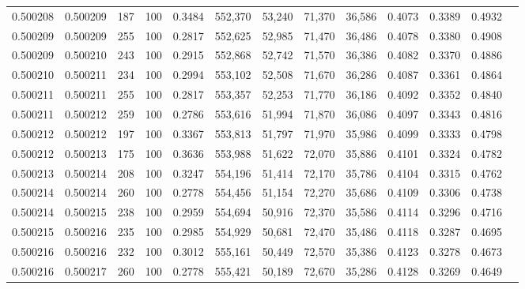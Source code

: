 \begin{tabular}{rrrrrrrrrrrrr}
0.500208 & 0.500209 &   187 & 100 &                                     0.3484 & 552,370 &  53,240 &  71,370 &  36,586 & 0.4073 & 0.3389 & 0.4932 \\
0.500209 & 0.500209 &   255 & 100 &                                     0.2817 & 552,625 &  52,985 &  71,470 &  36,486 & 0.4078 & 0.3380 & 0.4908 \\
0.500209 & 0.500210 &   243 & 100 &                                     0.2915 & 552,868 &  52,742 &  71,570 &  36,386 & 0.4082 & 0.3370 & 0.4886 \\
0.500210 & 0.500211 &   234 & 100 &                                     0.2994 & 553,102 &  52,508 &  71,670 &  36,286 & 0.4087 & 0.3361 & 0.4864 \\
0.500211 & 0.500211 &   255 & 100 &                                     0.2817 & 553,357 &  52,253 &  71,770 &  36,186 & 0.4092 & 0.3352 & 0.4840 \\
0.500211 & 0.500212 &   259 & 100 &                                     0.2786 & 553,616 &  51,994 &  71,870 &  36,086 & 0.4097 & 0.3343 & 0.4816 \\
0.500212 & 0.500212 &   197 & 100 &                                     0.3367 & 553,813 &  51,797 &  71,970 &  35,986 & 0.4099 & 0.3333 & 0.4798 \\
0.500212 & 0.500213 &   175 & 100 &                                     0.3636 & 553,988 &  51,622 &  72,070 &  35,886 & 0.4101 & 0.3324 & 0.4782 \\
0.500213 & 0.500214 &   208 & 100 &                                     0.3247 & 554,196 &  51,414 &  72,170 &  35,786 & 0.4104 & 0.3315 & 0.4762 \\
0.500214 & 0.500214 &   260 & 100 &                                     0.2778 & 554,456 &  51,154 &  72,270 &  35,686 & 0.4109 & 0.3306 & 0.4738 \\
0.500214 & 0.500215 &   238 & 100 &                                     0.2959 & 554,694 &  50,916 &  72,370 &  35,586 & 0.4114 & 0.3296 & 0.4716 \\
0.500215 & 0.500216 &   235 & 100 &                                     0.2985 & 554,929 &  50,681 &  72,470 &  35,486 & 0.4118 & 0.3287 & 0.4695 \\
0.500216 & 0.500216 &   232 & 100 &                                     0.3012 & 555,161 &  50,449 &  72,570 &  35,386 & 0.4123 & 0.3278 & 0.4673 \\
0.500216 & 0.500217 &   260 & 100 &                                     0.2778 & 555,421 &  50,189 &  72,670 &  35,286 & 0.4128 & 0.3269 & 0.4649 \\

\end{tabular}
